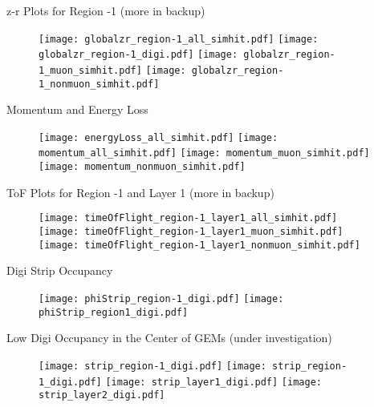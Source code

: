 \documentclass[11pt,a4paper]{beamer}
\begin{document}
\begin{frame}{z-r Plots for Region -1 (more in backup)}
\begin{figure}[htbp]
\hfill
\texttt{[image: globalzr\_region-1\_all\_simhit.pdf]} 
\hfill
\texttt{[image: globalzr\_region-1\_digi.pdf]}
\hfill
\texttt{[image: globalzr\_region-1\_muon\_simhit.pdf]} 
\hfill
\texttt{[image: globalzr\_region-1\_nonmuon\_simhit.pdf]}
\hfill
\end{figure}
\end{frame}

\begin{frame}{Momentum and Energy Loss}
\begin{figure}[htbp]
\hfill
\texttt{[image: energyLoss\_all\_simhit.pdf]} 
\hfill
\texttt{[image: momentum\_all\_simhit.pdf]}
\hfill
\texttt{[image: momentum\_muon\_simhit.pdf]} 
\hfill
\texttt{[image: momentum\_nonmuon\_simhit.pdf]}
\hfill
\end{figure}
\end{frame}

\begin{frame}{ToF Plots for Region -1 and Layer 1 (more in backup)}
\begin{figure}[htbp]
\hfill
\texttt{[image: timeOfFlight\_region-1\_layer1\_all\_simhit.pdf]} 
\hfill
\texttt{[image: timeOfFlight\_region-1\_layer1\_muon\_simhit.pdf]}
\hfill
\texttt{[image: timeOfFlight\_region-1\_layer1\_nonmuon\_simhit.pdf]} 
\hfill
\end{figure}
\end{frame}

\begin{frame}{Digi Strip Occupancy}
\begin{figure}[htbp]
\hfill
\texttt{[image: phiStrip\_region-1\_digi.pdf]} 
\hfill
\texttt{[image: phiStrip\_region1\_digi.pdf]}
\hfill
\end{figure}
\end{frame}

\begin{frame}{Low Digi Occupancy in the Center of GEMs (under investigation)}
\begin{figure}[htbp]
\hfill
\texttt{[image: strip\_region-1\_digi.pdf]} 
\hfill
\texttt{[image: strip\_region-1\_digi.pdf]}
\hfill
\texttt{[image: strip\_layer1\_digi.pdf]} 
\hfill
\texttt{[image: strip\_layer2\_digi.pdf]}
\hfill
\end{figure}
\end{frame}
\end{document}
